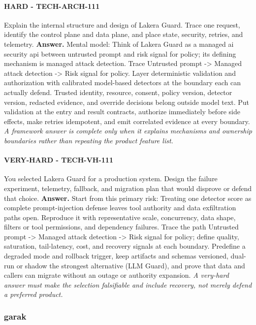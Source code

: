 \paragraph{HARD - TECH-ARCH-111} Explain the internal structure and design of Lakera Guard. Trace one request, identify the control plane and data plane, and place state, security, retries, and telemetry.
\textbf{Answer.} Mental model: Think of Lakera Guard as a managed ai security api between untrusted prompt and risk signal for policy; its defining mechanism is managed attack detection. Trace Untrusted prompt -> Managed attack detection -> Risk signal for policy. Layer deterministic validation and authorization with calibrated model-based detectors at the boundary each can actually defend. Trusted identity, resource, consent, policy version, detector version, redacted evidence, and override decisions belong outside model text. Put validation at the entry and result contracts, authorize immediately before side effects, make retries idempotent, and emit correlated evidence at every boundary.
\textit{A framework answer is complete only when it explains mechanisms and ownership boundaries rather than repeating the product feature list.}
\paragraph{VERY-HARD - TECH-VH-111} You selected Lakera Guard for a production system. Design the failure experiment, telemetry, fallback, and migration plan that would disprove or defend that choice.
\textbf{Answer.} Start from this primary risk: Treating one detector score as complete prompt-injection defense leaves tool authority and data exfiltration paths open. Reproduce it with representative scale, concurrency, data shape, filters or tool permissions, and dependency failures. Trace the path Untrusted prompt -> Managed attack detection -> Risk signal for policy; define quality, saturation, tail-latency, cost, and recovery signals at each boundary. Predefine a degraded mode and rollback trigger, keep artifacts and schemas versioned, dual-run or shadow the strongest alternative (LLM Guard), and prove that data and callers can migrate without an outage or authority expansion.
\textit{A very-hard answer must make the selection falsifiable and include recovery, not merely defend a preferred product.}
\subsubsection*{garak}
